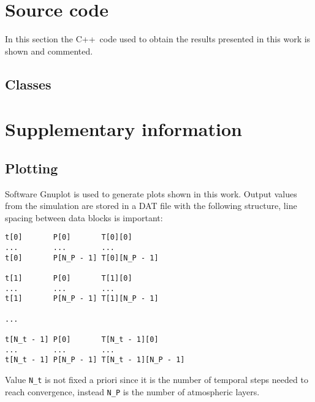 \documentclass[a4paper,10pt,draft,twocolumn]{article}
\newcommand{\cpp}{C++}
\begin{document}

\newpage
\appendix

\section{Source code}
In this section the \cpp\ code used to obtain the results presented in this work is shown and commented.

\subsection{Classes}

\section{Supplementary information}

\subsection{Plotting}
\label{sec:Plotting}
Software Gnuplot is used to generate plots shown in this work. Output values from the simulation are stored in a DAT file with the following structure, line spacing between data blocks is important:
\begin{verbatim}
t[0]       P[0]       T[0][0]
...        ...        ...
t[0]       P[N_P - 1] T[0][N_P - 1]

t[1]       P[0]       T[1][0]
...        ...        ...
t[1]       P[N_P - 1] T[1][N_P - 1]

...

t[N_t - 1] P[0]       T[N_t - 1][0]
...        ...        ...
t[N_t - 1] P[N_P - 1] T[N_t - 1][N_P - 1]
\end{verbatim}
Value \verb|N_t| is not fixed a priori since it is the number of temporal steps needed to reach convergence, instead \verb|N_P| is the number of atmospheric layers.

\newpage
\printbibliography[heading=bibintoc]
\end{document}

